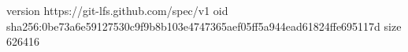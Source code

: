 version https://git-lfs.github.com/spec/v1
oid sha256:0be73a6e59127530c9f9b8b103e4747365aef05ff5a944ead61824ffe695117d
size 626416
